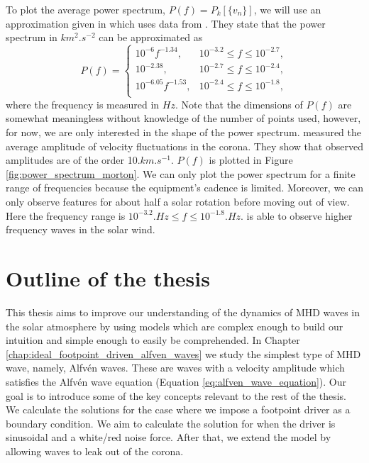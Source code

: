 To plot the average power spectrum, $P(f)=P_k[\{v_n\}]$, we will use an approximation given in \citet{Pagano2019} which uses data from \citet{Morton2016}. They state that the power spectrum in $\si{km^2.s^{-2}}$ can be approximated as
\begin{equation}
    P(f) = \begin{cases}
    10^{-6}f^{-1.34},     & 10^{-3.2} \le f \le 10^{-2.7}, \\
    10^{-2.38},           & 10^{-2.7} \le f \le 10^{-2.4}, \\
    10^{-6.05}f^{-1.53}, & 10^{-2.4} \le f \le 10^{-1.8}, \\
    \end{cases}
\end{equation}
where the frequency is measured in $\si{Hz}$. 
Note that the dimensions of $P(f)$ are somewhat meaningless without knowledge of the number of points used, however, for now, we are only interested in the shape of the power spectrum. \cite{McIntosh2011,McIntosh2012}  measured the average amplitude of velocity fluctuations in the corona. They show that observed amplitudes are of the order 10$\si{.km.s^{-1}}$. $P(f)$ is plotted in Figure \ref{fig:power_spectrum_morton}. We can only plot the power spectrum for a finite range of frequencies because the equipment’s cadence is limited. Moreover, we can only observe features for about half a solar rotation before moving out of view. Here the frequency range is $10^{-3.2}\si{.Hz} \le f \le 10^{-1.8}\si{.Hz}$. \citet{Podesta2007} is able to observe higher frequency waves in the solar wind.

\section{Outline of the thesis}

This thesis aims to improve our understanding of the dynamics of MHD waves in the solar atmosphere by using models which are complex enough to build our intuition and simple enough to easily be comprehended. In Chapter \ref{chap:ideal_footpoint_driven_alfven_waves} we study the simplest type of MHD wave, namely, Alfv\'en waves. These are waves with a velocity amplitude which satisfies the Alfv\'en wave equation (Equation \ref{eq:alfven_wave_equation}). Our goal is to introduce some of the key concepts relevant to the rest of the thesis. We calculate the solutions for the case where we impose a footpoint driver as a boundary condition. We aim to calculate the solution for when the driver is sinusoidal and a white/red noise force. After that, we extend the model by allowing waves to leak out of the corona.


